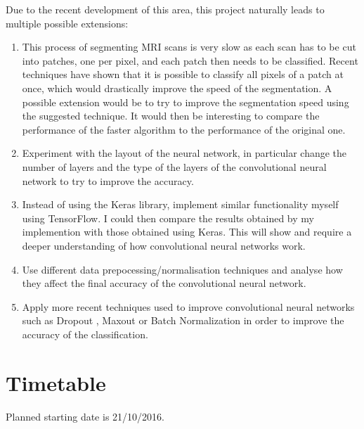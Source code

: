 \documentclass[12pt,a4paper,twoside]{article}
\begin{document}
Due to the recent development of this area, this project naturally leads to multiple possible extensions:
\begin{enumerate}
	\item This process of segmenting MRI scans is very slow as each scan has to be cut into patches, one per pixel, and each patch then needs to be classified. Recent techniques have shown that it is possible to classify all pixels of a patch at once, which would drastically improve the speed of the segmentation. A possible extension would be to try to improve the segmentation speed using the suggested technique. It would then be interesting to compare the performance of the faster algorithm to the performance of the original one.
	\item Experiment with the layout of the neural network, in particular change the number of layers and the type of the layers of the convolutional neural network to try to improve the accuracy.
	\item Instead of using the Keras library, implement similar functionality myself using TensorFlow. I could then compare the results obtained by my implemention with those obtained using Keras. This will show and require a deeper understanding of how convolutional neural networks work.
	\item Use different data prepocessing/normalisation techniques and analyse how they affect the final accuracy of the convolutional neural network.
	\item Apply more recent techniques used to improve convolutional neural networks such as Dropout \cite{dropout}, Maxout \cite{maxout} or Batch Normalization \cite{batch_normalization} in order to improve the accuracy of the classification.
\end{enumerate}

\section*{Timetable}

Planned starting date is 21/10/2016.
\end{document}
